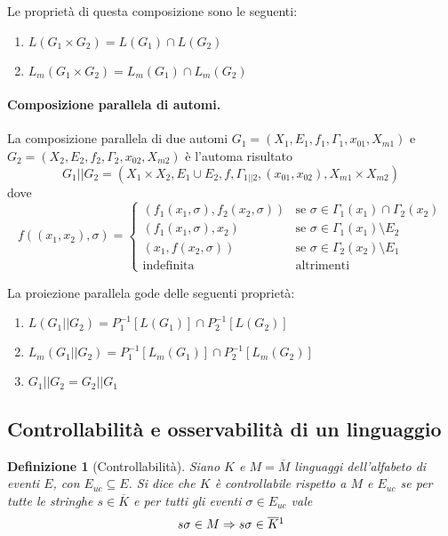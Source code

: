 \documentclass[a4paper, 11pt]{article}
\newcommand{\revp}[1]{P_{#1}^{-1}}
\newtheorem{definit}{Definizione}[subsection]
\begin{document}
Le proprietà di questa composizione sono le seguenti: \begin{enumerate}
	\item $L(G_1 \times G_2) = L(G_1) \cap L(G_2)$
	\item $L_m(G_1 \times G_2) = L_m(G_1) \cap L_m(G_2)$
\end{enumerate}

\paragraph{Composizione parallela di automi.} La composizione parallela di due automi $G_1 = (X_1, E_1, f_1, \Gamma_1, x_{01}, X_{m1})$ e $G_2 = (X_2, E_2, f_2, \Gamma_2, x_{02}, X_{m2})$ è l'automa risultato \[ G_1 \vert\vert G_2 = (X_1 \times X_2, E_1 \cup E_2,f,\Gamma_{1 \vert \vert 2}, (x_{01}, x_{02}), X_{m1} \times X_{m2}) \]
dove \[ 
	f((x_1, x_2), \sigma) = \begin{cases}
	(f_1(x_1, \sigma), f_2(x_2, \sigma)) &\text{se } \sigma \in \Gamma_1(x_1) \cap \Gamma_2(x_2) \\
	(f_1(x_1, \sigma), x_2) &\text{se } \sigma \in \Gamma_1(x_1) \setminus E_2 \\
	(x_1, f(x_2, \sigma)) &\text{se } \sigma \in \Gamma_2(x_2) \setminus E_1 \\
	\text{indefinita} &\text{altrimenti}
	\end{cases}
 \]
 
La proiezione parallela gode delle seguenti proprietà:\begin{enumerate}
	\item $L(G_1 \vert \vert G_2) = \revp{1}\left[ L(G_1) \right] \cap \revp{2}\left[ L(G_2) \right] $
	\item $L_m(G_1 \vert \vert G_2) = \revp{1}\left[ L_m(G_1) \right] \cap \revp{2}\left[ L_m(G_2) \right] $
	\item $G_1 \vert \vert G_2 = G_2 \vert \vert G_1$
\end{enumerate}

\subsection{Controllabilità e osservabilità di un linguaggio}

\begin{definit}[Controllabilità]
	Siano $K$ e $M = \overline{M}$ linguaggi dell'alfabeto di eventi $E$, con $E_{uc} \subseteq E$. Si dice che $K$ è controllabile rispetto a $M$ e $E_{uc}$ se per tutte le stringhe $s \in \overline{K}$ e per tutti gli eventi $\sigma \in E_{uc}$ vale \[s \sigma \in M \Rightarrow s\sigma \in \overline{K}\footnotemark \]
\end{definit}
\end{document}

